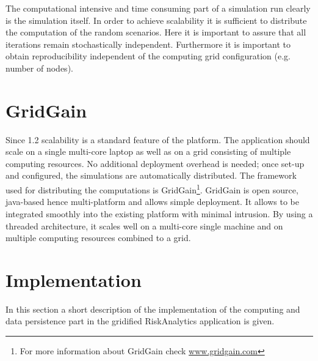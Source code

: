 The computational intensive and time consuming part of a simulation run clearly is the simulation itself. In order to achieve scalability it
is sufficient to distribute the computation of the random scenarios. Here it is important to assure that all iterations remain stochastically
independent. Furthermore it is important to obtain reproducibility independent of the computing grid configuration (e.g. number of nodes).
\pagebreak

\section{GridGain}

Since 1.2 scalability is a standard feature of the platform. The application should scale on a single multi-core laptop
as well as on a grid consisting of multiple computing resources. No additional deployment overhead is needed; once set-up
and configured, the simulations are automatically  distributed.
The framework used for distributing the computations is GridGain\footnote{For more information about GridGain check
\href{http://www.gridgain.com}{www.gridgain.com}}.
GridGain is open source, java-based hence multi-platform and allows simple deployment. It allows to be integrated smoothly
into the existing platform with minimal intrusion. By using a threaded architecture, it scales well on a multi-core
single machine and on multiple computing resources combined to a grid.

\section{Implementation}
In this section a short description of the implementation of the computing and data persistence part in the gridified RiskAnalytics
application is given.

